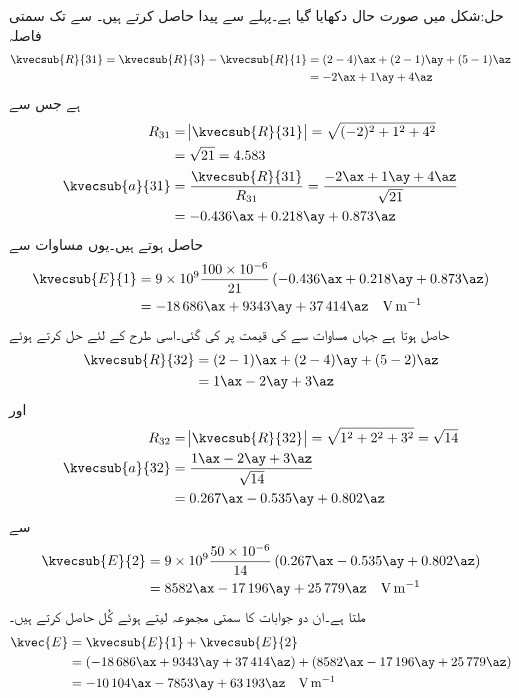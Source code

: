 حل:شکل  میں صورت حال دکھایا گیا ہے۔پہلے  سے پیدا  حاصل کرتے ہیں۔  سے  تک سمتی فاصلہ
\begin{align*}
\kvecsub{R}{31}=\kvecsub{R}{3}-\kvecsub{R}{1}&=(2-4)\ax+(2-1)\ay+(5-1)\az\\
&=-2\ax+1\ay+4\az
\end{align*}
ہے جس سے
\begin{align*}
R_{31}&=\abs{\kvecsub{R}{31}}=\sqrt{(-2)^2+1^2+4^2}\\
&=\sqrt{21}=4.583\\
\kvecsub{a}{31}&=\frac{\kvecsub{R}{31}}{R_{31}}=\frac{-2\ax+1\ay+4\az}{\sqrt{21}}\\
&=-0.436\ax+0.218\ay+0.873\az
\end{align*}
حاصل ہوتے ہیں۔یوں مساوات  سے
\begin{align*}
\kvecsub{E}{1}&=9 \times 10^9 \frac{100 \times 10^{-6}}{21} \left(-0.436\ax+0.218\ay+0.873\az\right)\\
&=-\num{18686}\ax+\num{9343}\ay+\num{37414}\az \quad \si{\volt \per \meter}
\end{align*}
حاصل ہوتا ہے جہاں مساوات  سے  کی قیمت  پر کی گئی۔اسی طرح  کے لئے حل کرتے ہوئے
\begin{align*}
\kvecsub{R}{32}&=(2-1)\ax+(2-4)\ay+(5-2)\az\\
&=1\ax-2\ay+3\az
\end{align*}
اور
\begin{align*}
R_{32}&=\abs{\kvecsub{R}{32}}=\sqrt{1^2+2^2+3^2}=\sqrt{14}\\
\kvecsub{a}{32}&=\frac{1\ax-2\ay+3\az}{\sqrt{14}}\\
&=0.267\ax-0.535\ay+0.802\az
\end{align*}
سے
\begin{align*}
\kvecsub{E}{2}&=9 \times 10^9 \frac{50 \times 10^{-6}}{14} \left(0.267\ax-0.535\ay+0.802\az \right)\\
&=\num{8582}\ax-\num{17196}\ay+\num{25779}\az \quad \si{\volt \per \meter}
\end{align*}
ملتا ہے۔ان دو جوابات کا سمتی مجموعہ لیتے ہوئے کُل  حاصل کرتے ہیں۔
\begin{align*}
\kvec{E}&=\kvecsub{E}{1}+\kvecsub{E}{2}\\
&=\left(\num{-18686} \ax+\num{9343} \ay+\num{37414}\az\right)+\left(\num{8582}\ax-\num{17196}\ay+\num{25779}\az\right)\\
&=-\num{10104}\ax-\num{7853}\ay+\num{63193}\az \quad \si{\volt \per \meter}
\end{align*} 
 
